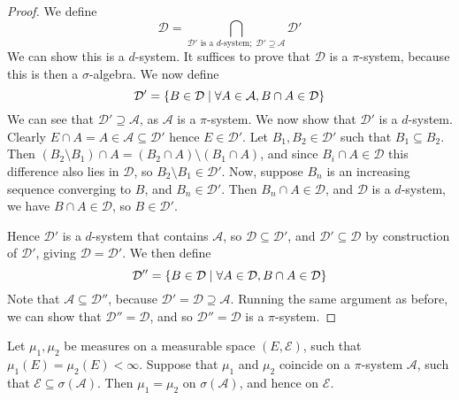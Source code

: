 \begin{proof}
	We define
	\[ \mathcal D = \bigcap_{\mathcal D' \text{ is a } d \text{-system};\; \mathcal D' \supseteq \mathcal A} \mathcal D' \]
	We can show this is a \( d \)-system.
	It suffices to prove that \( \mathcal D \) is a \( \pi \)-system, because this is then a \( \sigma \)-algebra.
	We now define
	\[ \mathcal D' = \qty{B \in \mathcal D \mid \forall A \in \mathcal A, B \cap A \in \mathcal D} \]
	We can see that \( \mathcal D' \supseteq \mathcal A \), as \( \mathcal A \) is a \( \pi \)-system.
	We now show that \( \mathcal D' \) is a \( d \)-system.
	Clearly \( E \cap A = A \in \mathcal A \subseteq \mathcal D' \) hence \( E \in \mathcal D' \).
	Let \( B_1, B_2 \in \mathcal D' \) such that \( B_1 \subseteq B_2 \).
	Then \( (B_2 \setminus B_1) \cap A = (B_2 \cap A) \setminus (B_1 \cap A) \), and since \( B_i \cap A \in \mathcal D \) this difference also lies in \( \mathcal D \), so \( B_2 \setminus B_1 \in \mathcal D' \).
	Now, suppose \( B_n \) is an increasing sequence converging to \( B \), and \( B_n \in \mathcal D' \).
	Then \( B_n \cap A \in \mathcal D \), and \( \mathcal D \) is a \( d \)-system, we have \( B \cap A \in \mathcal D \), so \( B \in \mathcal D' \).

	Hence \( \mathcal D' \) is a \( d \)-system that contains \( \mathcal A \), so \( \mathcal D \subseteq \mathcal D' \), and \( \mathcal D' \subseteq \mathcal D \) by construction of \( \mathcal D' \), giving \( \mathcal D = \mathcal D' \).
	We then define
	\[ \mathcal D'' = \qty{B \in \mathcal D \mid \forall A \in \mathcal D, B \cap A \in \mathcal D} \]
	Note that \( \mathcal A \subseteq \mathcal D'' \), because \( \mathcal D' = \mathcal D \supseteq \mathcal A \).
	Running the same argument as before, we can show that \( \mathcal D'' = \mathcal D \), and so \( \mathcal D'' = \mathcal D \) is a \( \pi \)-system.
\end{proof}
\begin{theorem}
	Let \( \mu_1, \mu_2 \) be measures on a measurable space \( (E, \mathcal E) \), such that \( \mu_1(E) = \mu_2(E) < \infty \).
	Suppose that \( \mu_1 \) and \( \mu_2 \) coincide on a \( \pi \)-system \( \mathcal A \), such that \( \mathcal E \subseteq \sigma(\mathcal A) \).
	Then \( \mu_1 = \mu_2 \) on \( \sigma(\mathcal A) \), and hence on \( \mathcal E \).
\end{theorem}
